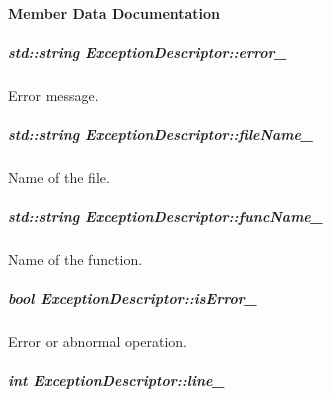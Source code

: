 \paragraph{Member Data Documentation}
\hypertarget{group___core_a9a0ee9381ed48d3d315a9e091be1d817}{
\subparagraph[{error\-\_\-}]{\setlength{\rightskip}{0pt plus 5cm}std\-::string Exception\-Descriptor\-::error\-\_\-\hspace{0.3cm}{\ttfamily [private]}}}\label{group___core_a9a0ee9381ed48d3d315a9e091be1d817}


Error message. 

\hypertarget{group___core_a28d43a19c103c7622e5fb225d9ac81bc}{
\subparagraph[{file\-Name\-\_\-}]{\setlength{\rightskip}{0pt plus 5cm}std\-::string Exception\-Descriptor\-::file\-Name\-\_\-\hspace{0.3cm}{\ttfamily [private]}}}\label{group___core_a28d43a19c103c7622e5fb225d9ac81bc}


Name of the file. 

\hypertarget{group___core_a338c02c76b2631e1948b3d15dd256c5f}{
\subparagraph[{func\-Name\-\_\-}]{\setlength{\rightskip}{0pt plus 5cm}std\-::string Exception\-Descriptor\-::func\-Name\-\_\-\hspace{0.3cm}{\ttfamily [private]}}}\label{group___core_a338c02c76b2631e1948b3d15dd256c5f}


Name of the function. 

\hypertarget{group___core_ae59cb81febf52e97aac91bcc5006c4f0}{
\subparagraph[{is\-Error\-\_\-}]{\setlength{\rightskip}{0pt plus 5cm}bool Exception\-Descriptor\-::is\-Error\-\_\-\hspace{0.3cm}{\ttfamily [private]}}}\label{group___core_ae59cb81febf52e97aac91bcc5006c4f0}


Error or abnormal operation. 

\hypertarget{group___core_aa6b8d6a6cadfe9e645409bb1ab8fd788}{
\subparagraph[{line\-\_\-}]{\setlength{\rightskip}{0pt plus 5cm}int Exception\-Descriptor\-::line\-\_\-\hspace{0.3cm}{\ttfamily [private]}}}\label{group___core_aa6b8d6a6cadfe9e645409bb1ab8fd788}


